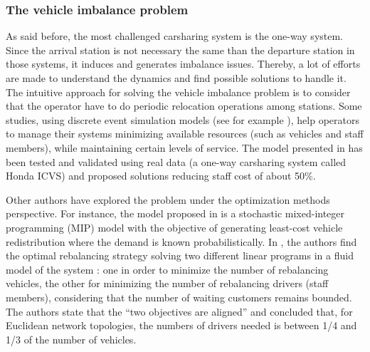 \begin{bibunit}[ieeetr]
\subsubsection{The vehicle imbalance problem}
As said before, the most challenged carsharing system is the one-way system. Since the arrival station is not necessary the same than the departure station in those systems, it induces and generates imbalance issues.
Thereby, a lot of efforts are made to understand the dynamics and find possible solutions to handle it.
The intuitive approach for solving the vehicle imbalance problem is to consider that the operator have to do periodic relocation operations among stations.
Some studies, using discrete event simulation models (see for example \cite{barth_simulation_1999, kek_relocation_2006, kek_decision_2009}), help operators to manage their systems minimizing available resources (such as vehicles and staff members), while maintaining certain levels of service.
The model presented in \cite{kek_decision_2009} has been tested and validated using real data (a one-way carsharing system called Honda ICVS) and proposed solutions reducing staff cost of about 50\%.

\medskip
Other authors have explored the problem under the optimization methods perspective.
For instance, the model proposed in \cite{nair_fleet_2011} is a stochastic mixed-integer programming (MIP) model with the objective of generating least-cost vehicle redistribution where the demand is known probabilistically.
In \cite{smith_rebalancing_2013}, the authors find the optimal rebalancing strategy solving two different linear programs in a fluid model of the system : one in order to minimize the number of rebalancing vehicles, the other for minimizing the number of rebalancing drivers (staff members), considering that the number of waiting customers remains bounded.
The authors state that the ``two objectives are aligned'' and concluded that, for Euclidean network topologies, the numbers of drivers needed is between 1/4 and 1/3 of the number of vehicles.


\end{bibunit}
